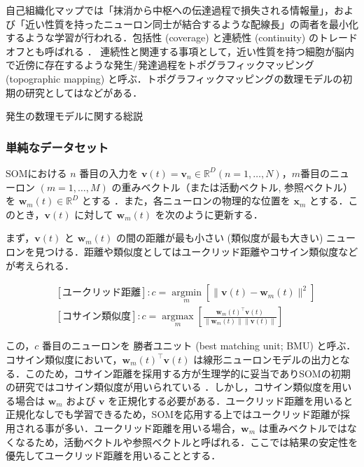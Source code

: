 \documentclass[titlepage]{ltjsbook}
\begin{document}
自己組織化マップでは「抹消から中枢への伝達過程で損失される情報量」，および「近い性質を持ったニューロン同士が結合するような配線長」の両者を最小化するような学習が行われる．包括性 (coverage) と連続性 (continuity) のトレードオフとも呼ばれる \citep{Carreira-Perpinan2005-gy}． 連続性と関連する事項として，近い性質を持つ細胞が脳内で近傍に存在するような発生/発達過程をトポグラフィックマッピング (topographic mapping) と呼ぶ．トポグラフィックマッピングの数理モデルの初期の研究としては\citep{Von_der_Malsburg1973-bz,Willshaw1976-zo, Takeuchi1979-mi}などがある．

発生の数理モデルに関する総説 \citep{Van_Ooyen2011-fz, Goodhill2018-ho}

\subsubsection{単純なデータセット}
SOMにおける $n$ 番目の入力を $\mathbf{v}(t)=\mathbf{v}_n\in \mathbb{R}^{D} (n=1, \ldots, N)$，$m$番目のニューロン $(m=1, \ldots, M)$ の重みベクトル（または活動ベクトル, 参照ベクトル）を $\mathbf{w}_m(t)\in \mathbb{R}^{D}$ とする \citep{Kohonen2013-yt}．また，各ニューロンの物理的な位置を $\mathbf{x}_m$ とする．このとき，$\mathbf{v}(t)$ に対して $\mathbf{w}_m(t)$ を次のように更新する．

まず，$\mathbf{v}(t)$ と $\mathbf{w}_m(t)$ の間の距離が最も小さい (類似度が最も大きい) ニューロンを見つける．距離や類似度としてはユークリッド距離やコサイン類似度などが考えられる．

\begin{align}
&[\text{ユークリッド距離}]: c = \underset{m}{\operatorname{argmin}}\left[\|\mathbf{v}(t)-\mathbf{w}_m(t)\|^2\right]\\
&[\text{コサイン類似度}]: c  = \underset{m}{\operatorname{argmax}}\left[\frac{\mathbf{w}_m(t)^\top\mathbf{v}(t)}{\|\mathbf{w}_m(t)\|\|\mathbf{v}(t)\|}\right]
\end{align}

この，$c$ 番目のニューロンを 勝者ユニット (best matching unit; BMU) と呼ぶ．コサイン類似度において，$\mathbf{w}_m(t)^\top\mathbf{v}(t)$ は線形ニューロンモデルの出力となる．このため，コサイン距離を採用する方が生理学的に妥当でありSOMの初期の研究ではコサイン類似度が用いられている \citep{Kohonen1982-mn}．しかし，コサイン類似度を用いる場合は $\mathbf{w}_m$ および $\mathbf{v}$ を正規化する必要がある．ユークリッド距離を用いると正規化なしでも学習できるため，SOMを応用する上ではユークリッド距離が採用される事が多い．ユークリッド距離を用いる場合，$\mathbf{w}_m$ は重みベクトルではなくなるため，活動ベクトルや参照ベクトルと呼ばれる．ここでは結果の安定性を優先してユークリッド距離を用いることとする．
\end{document}
